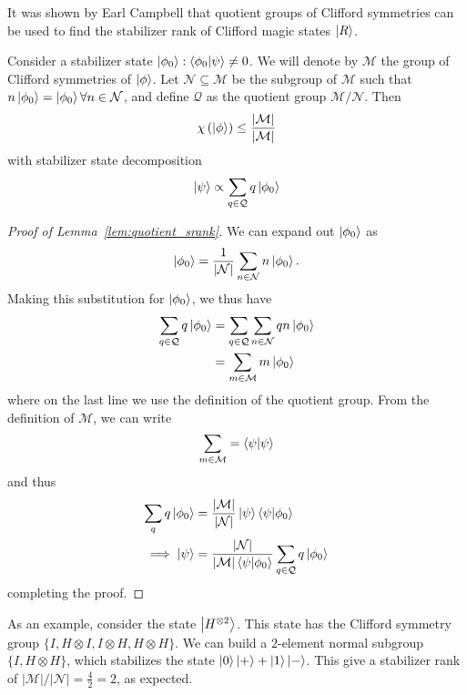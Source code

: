 It was shown by Earl Campbell that quotient groups of Clifford symmetries can be used to find the stabilizer rank of Clifford magic states $\ket{R}$. 
\begin{lem}\label{lem:quotient_srank}
Consider a stabilizer state $\ket{\phi_{0}}:\braket{\phi_{0}}{\psi}\neq 0$. We will denote by $\mathcal{M}$ the group of Clifford symmetries of $\ket{\phi}$. Let $\mathcal{N}\subseteq\mathcal{M}$ be the subgroup of $\mathcal{M}$ such that $n\ket{\phi_{0}}=\ket{\phi_{0}}\forall n\in\mathcal{N}$, and define $\mathcal{Q}$ as the quotient group $\mathcal{M}/\mathcal{N}$. Then
\begin{equation}
\chi\left(\ket{\phi}\right)\leq \frac{\left|\mathcal{M}\right|}{\left|\mathcal{M}\right|}
\label{eq:quotient_srank}
\end{equation}
with stabilizer state decomposition
\begin{equation}
\ket{\psi} \propto \sum_{q\in\mathcal{Q}}q\ket{\phi_{0}}
\label{eq:subgroup_decomposition}
\end{equation}
\end{lem}
\begin{proof}[Proof of Lemma~\ref{lem:quotient_srank}]
We can expand out $\ket{\phi_{0}}$ as
\[\ket{\phi_{0}}=\frac{1}{\left|\mathcal{N}\right|}\sum_{n\in\mathcal{N}}n\ket{\phi_{0}}.\]
Making this substitution for $\ket{\phi_{0}}$, we thus have
\begin{align*}
\sum_{q\in\mathcal{Q}}q\ket{\phi_{0}}&=\sum_{q\in\mathcal{Q}}\sum_{n\in\mathcal{N}}qn\ket{\phi_{0}}\\&=\sum_{m\in\mathcal{M}}m\ket{\phi_{0}}
\end{align*}
where on the last line we use the definition of the quotient group. From the definition of $\mathcal{M}$, we can write
\[\sum_{m\in\mathcal{M}}=\braket{\psi}\]
and thus
\begin{align*}
\sum_{q}q\ket{\phi_{0}}&=\frac{\left|\mathcal{M}\right|}{\left|\mathcal{N}\right|} \ket{\psi}\braket{\psi}{\phi_{0}}\\
\implies \ket{\psi} &= \frac{\left|\mathcal{N}\right|}{\left|\mathcal{M}\right|\braket{\psi}{\phi_{0}}} \sum_{q\in\mathcal{Q}}q\ket{\phi_{0}}
\end{align*}
completing the proof.
\end{proof}
As an example, consider the state $\ket{H^{\otimes 2}}$. This state has the Clifford symmetry group $\{I, H\otimes I, I\otimes H, H\otimes H\}$. We can build a $2$-element normal subgroup $\{I,H\otimes H\}$, which stabilizes the state $
\ket{0}\ket{+} + \ket{1}\ket{-}$. This give a stabilizer rank of $\left|\mathcal{M}\right|/\left|\mathcal{N}\right|=\frac{4}{2}=2$, as expected.\par
